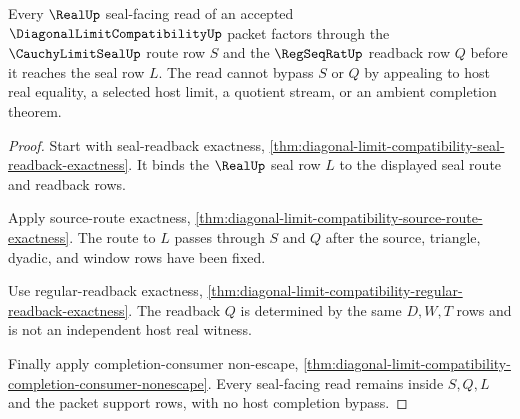 \begin{theorem}
\label{thm:diagonal-limit-compatibility-real-seal-source-lock}
Every $\RealUp$ seal-facing read of an accepted $\DiagonalLimitCompatibilityUp$ packet factors through the $\CauchyLimitSealUp$ route row $S$ and the $\RegSeqRatUp$ readback row $Q$ before it reaches the seal row $L$. The read cannot bypass $S$ or $Q$ by appealing to host real equality, a selected host limit, a quotient stream, or an ambient completion theorem.
\end{theorem}
\begin{proof}
Start with seal-readback exactness, \autoref{thm:diagonal-limit-compatibility-seal-readback-exactness}. It binds the $\RealUp$ seal row $L$ to the displayed seal route and readback rows.

Apply source-route exactness, \autoref{thm:diagonal-limit-compatibility-source-route-exactness}. The route to $L$ passes through $S$ and $Q$ after the source, triangle, dyadic, and window rows have been fixed.

Use regular-readback exactness, \autoref{thm:diagonal-limit-compatibility-regular-readback-exactness}. The readback $Q$ is determined by the same $D,W,T$ rows and is not an independent host real witness.

Finally apply completion-consumer non-escape, \autoref{thm:diagonal-limit-compatibility-completion-consumer-nonescape}. Every seal-facing read remains inside $S,Q,L$ and the packet support rows, with no host completion bypass.
\end{proof}

